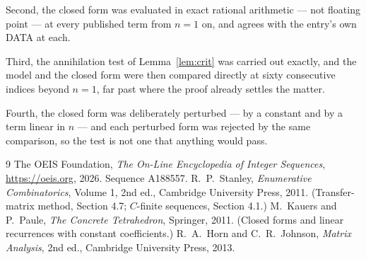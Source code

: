 \documentclass[11pt,a4paper]{article}
\theoremstyle{plain}
\theoremstyle{definition}
\begin{document}
Second, the closed form was evaluated in exact rational arithmetic --- not floating point ---
at every published term from $n=1$ on, and agrees with the entry's own DATA at each.

Third, the annihilation test of Lemma~\ref{lem:crit} was carried out exactly, and the model
and the closed form were then compared directly at sixty consecutive indices beyond
$n=1$, far past where the proof already settles the matter.

Fourth, the closed form was deliberately perturbed --- by a constant and by a term linear in
$n$ --- and each perturbed form was rejected by the same comparison, so the test is not one
that anything would pass.

\begin{thebibliography}{9}
 The OEIS Foundation, \emph{The On-Line Encyclopedia of Integer
Sequences}, \url{https://oeis.org}, 2026. Sequence A188557.
 R.~P.~Stanley, \emph{Enumerative Combinatorics}, Volume 1, 2nd ed.,
Cambridge University Press, 2011. (Transfer-matrix method, Section 4.7; $C$-finite sequences,
Section 4.1.)
 M.~Kauers and P.~Paule, \emph{The Concrete Tetrahedron}, Springer, 2011.
(Closed forms and linear recurrences with constant coefficients.)
 R.~A.~Horn and C.~R.~Johnson, \emph{Matrix Analysis}, 2nd ed., Cambridge
University Press, 2013.
\end{thebibliography}
\end{document}
